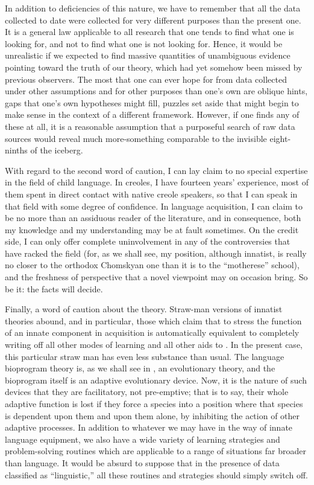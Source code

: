 In addition to deficiencies of this nature, we have to remember that all the data collected to date were collected for very different purposes than the present one. It is a general law applicable to all research that one tends to find what one is looking for, and not to find what one is not looking for. Hence, it would be unrealistic if we expected to find massive quantities of unambiguous evidence pointing toward the truth of our theory, which had yet somehow been missed by previous observers. The most that one can ever hope for from data collected under other assumptions and for other purposes than one's own are oblique hints, gaps that one's own hypotheses might fill, puzzles set aside that might begin to make sense in the context of a different framework. However, if one finds any of these at all, it is a reasonable assumption that a purposeful search of raw data sources would reveal much more-something comparable to the invisible eight-ninths of the iceberg.

With regard to the second word of caution, I can lay claim to no special expertise in the field of child language. In creoles, I have fourteen years' experience, most of them spent in direct contact with native creole speakers, so that I can speak in that field with some degree of confidence. In language acquisition, I can claim to be no more than an assiduous reader of the literature, and in consequence, both my knowledge and my understanding may be at fault sometimes. On the credit side, I can only offer complete uninvolvement in any of the controversies that have racked the field (for, as we shall see, my position, although innatist, is really no closer to the orthodox Chomskyan one than it is to the ``motherese'' school), and the freshness of perspective that a novel viewpoint may on occasion bring. So be it: the facts will decide.

Finally, a word of caution about the theory. Straw-man versions
of innatist theories abound, and in particular, those which claim that to stress the function of an innate component in acquisition is automatically equivalent to completely writing off all other modes of learning and all other aids to . In the present case, this particular straw man has even less substance than usual. The language bioprogram theory is, as we shall see in , an evolutionary theory, and the bioprogram itself is an adaptive evolutionary device. Now, it is the nature of such devices that they are facilitatory, not pre-emptive; that is to say, their whole adaptive function is lost if they force a species into a position where that species is dependent upon them and upon them alone, by inhibiting the action of other adaptive processes. In addition to whatever we may have in the way of innate language equipment, we also have a wide variety of learning strategies and problem-solving routines which are applicable to a range of situations far broader than language. It would be absurd to suppose that in the presence of data classified as ``linguistic,'' all these routines and strategies should simply switch off.

